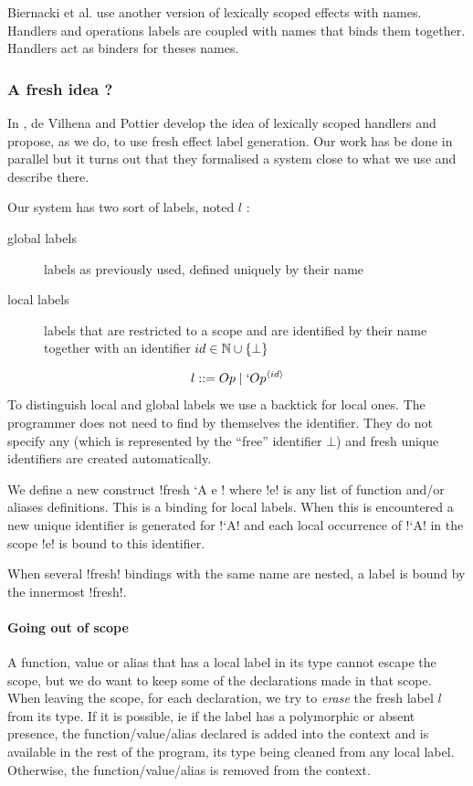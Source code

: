 \documentclass[11pt, nonacm=true, language=french, language=english]{acmart}
\begin{document}
Biernacki et al. \cite{binders-labels} use another version of lexically scoped effects with names. Handlers and operations labels are coupled with names that binds them together. Handlers act as binders for theses names.

\subsubsection{A fresh idea ?}
\label{sec:fresh-idea}

In \cite{tes}, de Vilhena and Pottier develop the idea of lexically scoped handlers and propose, as we do, to use fresh effect label generation. Our work has be done in parallel but it turns out that they formalised a system close to what we use and describe there.

Our system has two sort of labels, noted $l$ :
\begin{description}
  \item[global labels] labels as previously used, defined uniquely by their name
  \item[local labels] labels that are restricted to a scope and are identified by their name together with an identifier $id \in \mathbb N \cup \{\bot\}$
\end{description}
$$ l ::= Op \mid `Op^{\langle id\rangle} $$
To distinguish local and global labels we use a backtick for local ones. The programmer does not need to find by themselves the identifier. They do not specify any (which is represented by the ``free'' identifier $\bot$) and fresh unique identifiers are created automatically.

We define a new construct !fresh `A { e }!  where !e! is any list of function and/or aliases definitions. This is a binding for local labels. When this is encountered a new unique identifier is generated for !`A! and each local occurrence of !`A! in the scope !e! is bound to this identifier.
\begin{rem}
  When several !fresh! bindings with the same name are nested, a label is bound by the innermost !fresh!.
\end{rem}

\paragraph{Going out of scope}
A function, value or alias that has a local label in its type cannot escape the scope, but we do want to keep some of the declarations made in that scope. When leaving the scope, for each declaration, we try to \emph{erase} the fresh label $l$ from its type. If it is possible, ie if the label has a polymorphic or absent presence, the function/value/alias declared is added into the context and is available in the rest of the program, its type being cleaned from any local label. Otherwise, the function/value/alias is removed from the context.
\end{document}
